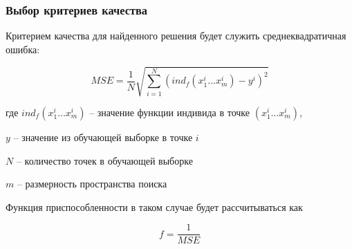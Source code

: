 \subsubsection{Выбор критериев качества}
Критерием качества для найденного решения будет служить среднеквадратичная ошибка:

\begin{equation}
\label{equation:geneticsMSE}
MSE = \frac{1}{N}\sqrt{\sum_{i=1}^N(ind_f(x_1^i ... x_m^i) - y^i)^2}
\end{equation}
\begin{ESKDexplanation}
\item[где ] $ind_f(x_1^i ... x_m^i)$ -- значение функции индивида в точке $(x_1^i ... x_m^i)$,
\item $y$ -- значение из обучающей выборке в точке $i$
\item $N$ -- количество точек в обучающей выборке
\item $m$ -- размерность пространства поиска
\end{ESKDexplanation}

Функция приспособленности в таком случае будет рассчитываться как

\begin{equation}
\label{equation:geneticsFit}
f = \frac{1}{MSE}
\end{equation}